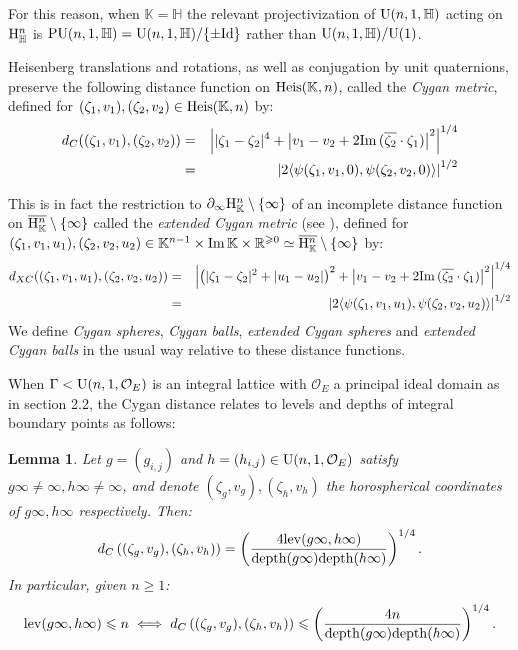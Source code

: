 \documentclass{article}[12pt]
\newcommand{\R}{\mathbb{R}}
\newcommand{\K}{\mathbb{K}}
\newcommand{\quat}{\mathbb{H}}
\newtheorem{lem}{Lemma}%
\begin{document}
For this reason, when $\K=\quat$ the relevant projectivization of ${\rm U}(n,1,\quat)$ acting on ${\rm H}_\quat^n$ is ${\rm PU}(n,1,\quat)={\rm U}(n,1,\quat)/\{\pm{\rm Id} \}$ rather than ${\rm U}(n,1,\quat)/{\rm U}(1)$.

Heisenberg translations and rotations, as well as conjugation by unit quaternions, preserve the following distance function on ${\rm Heis}(\K,n)$, called the \emph{Cygan metric}, defined for $(\zeta_1,v_1), (\zeta_2,v_2) \in {\rm Heis}(\K,n)$ by:
\begin{eqnarray}\label{cygan} 
d_C((\zeta_1,v_1), (\zeta_2,v_2)) & = & \left\vert |\zeta_1-\zeta_2|^4 +  \left\vert v_1-v_2+2{\rm Im}\, (\overline{\zeta_2} \cdot \zeta_1)\right\vert^2 \right\vert^{1/4} \\
 & = & \left\vert 2 \langle \psi(\zeta_1,v_1,0),\psi(\zeta_2,v_2,0 )   \rangle \right\vert ^{1/2} 
\end{eqnarray} 

This is in fact the restriction to $\partial_\infty {\rm H}_\K^n \setminus \{ \infty \}$ of an incomplete distance function on $\overline{{\rm H}_\K^n}\setminus \{ \infty \}$ called the \emph{extended Cygan metric} (see \cite{KP}), defined for $(\zeta_1,v_1,u_1), (\zeta_2,v_2,u_2) \in \K^{n-1} \times {\rm Im} \, \K \times \R^{\geqslant 0} \simeq \overline{{\rm H}_\K^n} \setminus \{ \infty \}$ by:
\begin{eqnarray}\label{extcygan} 
d_{XC}((\zeta_1,v_1,u_1), (\zeta_2,v_2,u_2)) & = & \left\vert \left(|\zeta_1-\zeta_2|^2+|u_1-u_2|\right)^2 +  \left\vert v_1-v_2+2{\rm Im}\, (\overline{\zeta_2}\cdot \zeta_1)\right\vert^2 \right\vert^{1/4} \\
 & = & \left\vert 2 \langle \psi(\zeta_1,v_1,u_1),\psi(\zeta_2,v_2,u_2) \rangle \right\vert ^{1/2} 
\end{eqnarray} 
We define \emph{Cygan spheres}, \emph{Cygan balls}, \emph{extended Cygan spheres} and \emph{extended Cygan balls} in the usual way relative to these distance functions. 

When $\Gamma < {\rm U}(n,1,\mathcal{O}_E)$ is an integral lattice with $\mathcal{O}_E$ a principal ideal domain as in section 2.2, the Cygan distance relates to levels and depths of integral boundary points as follows:

\begin{lem}\label{cyganbound} Let $g=(g_{i,j})$ and $h=(h_{i,j}) \in {\rm U}(n,1,\mathcal{O}_E)$ satisfy $g\infty \neq \infty, h\infty \neq \infty$, and denote $(\zeta_g,v_g),(\zeta_h,v_h)$ the horospherical coordinates of $g\infty,h\infty$   respectively. Then:
$$ d_C \left(  (\zeta_g,v_g),(\zeta_h,v_h)  \right) = \left( \frac{4{\rm lev}(g\infty,h\infty)}{{\rm depth}(g\infty){\rm depth}(h\infty)} \right) ^{1/4}.
$$
In particular, given $n \geqslant 1$:
$$ {\rm lev}(g\infty,h\infty) \leqslant n \iff d_C \left(  (\zeta_g,v_g),(\zeta_h,v_h)  \right) \leqslant \left( \frac{4n}{{\rm depth}(g\infty){\rm depth}(h\infty)} \right) ^{1/4}.
$$
\end{lem}
\end{document}
